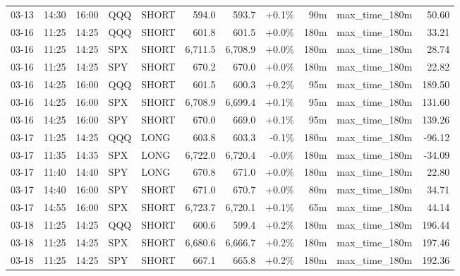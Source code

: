 \documentclass[11pt,a4paper,twoside]{article}
\begin{document}
\begin{center}
\begin{longtable}{>{\color{txtmain}}l l l l l r r r r >{\color{txtmain}}l r}
03-13 & 14:30 & 16:00 & QQQ & SHORT & 594.0 & 593.7 & \textcolor{wingreen}{+0.1\%} & 90m & max\_time\_180m & \textcolor{wingreen}{50.60} \\
03-16 & 11:25 & 14:25 & QQQ & SHORT & 601.8 & 601.5 & \textcolor{wingreen}{+0.0\%} & 180m & max\_time\_180m & \textcolor{wingreen}{33.21} \\
03-16 & 11:25 & 14:25 & SPX & SHORT & 6,711.5 & 6,708.9 & \textcolor{wingreen}{+0.0\%} & 180m & max\_time\_180m & \textcolor{wingreen}{28.74} \\
03-16 & 11:25 & 14:25 & SPY & SHORT & 670.2 & 670.0 & \textcolor{wingreen}{+0.0\%} & 180m & max\_time\_180m & \textcolor{wingreen}{22.82} \\
03-16 & 14:25 & 16:00 & QQQ & SHORT & 601.5 & 600.3 & \textcolor{wingreen}{+0.2\%} & 95m & max\_time\_180m & \textcolor{wingreen}{189.50} \\
03-16 & 14:25 & 16:00 & SPX & SHORT & 6,708.9 & 6,699.4 & \textcolor{wingreen}{+0.1\%} & 95m & max\_time\_180m & \textcolor{wingreen}{131.60} \\
03-16 & 14:25 & 16:00 & SPY & SHORT & 670.0 & 669.0 & \textcolor{wingreen}{+0.1\%} & 95m & max\_time\_180m & \textcolor{wingreen}{139.26} \\
03-17 & 11:25 & 14:25 & QQQ & LONG & 603.8 & 603.3 & \textcolor{lossred}{-0.1\%} & 180m & max\_time\_180m & \textcolor{lossred}{-96.12} \\
03-17 & 11:35 & 14:35 & SPX & LONG & 6,722.0 & 6,720.4 & \textcolor{lossred}{-0.0\%} & 180m & max\_time\_180m & \textcolor{lossred}{-34.09} \\
03-17 & 11:40 & 14:40 & SPY & LONG & 670.8 & 671.0 & \textcolor{wingreen}{+0.0\%} & 180m & max\_time\_180m & \textcolor{wingreen}{22.80} \\
03-17 & 14:40 & 16:00 & SPY & SHORT & 671.0 & 670.7 & \textcolor{wingreen}{+0.0\%} & 80m & max\_time\_180m & \textcolor{wingreen}{34.71} \\
03-17 & 14:55 & 16:00 & SPX & SHORT & 6,723.7 & 6,720.1 & \textcolor{wingreen}{+0.1\%} & 65m & max\_time\_180m & \textcolor{wingreen}{44.14} \\
03-18 & 11:25 & 14:25 & QQQ & SHORT & 600.6 & 599.4 & \textcolor{wingreen}{+0.2\%} & 180m & max\_time\_180m & \textcolor{wingreen}{196.44} \\
03-18 & 11:25 & 14:25 & SPX & SHORT & 6,680.6 & 6,666.7 & \textcolor{wingreen}{+0.2\%} & 180m & max\_time\_180m & \textcolor{wingreen}{197.46} \\
03-18 & 11:25 & 14:25 & SPY & SHORT & 667.1 & 665.8 & \textcolor{wingreen}{+0.2\%} & 180m & max\_time\_180m & \textcolor{wingreen}{192.36} \\

\end{longtable}
\end{center}
\end{document}
